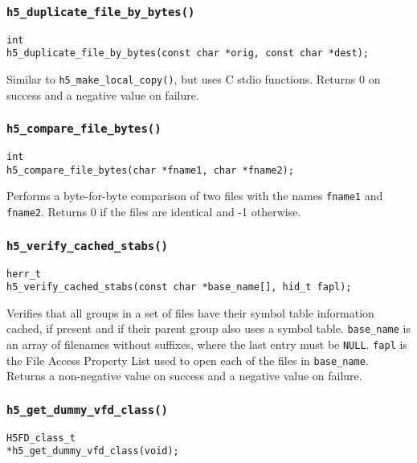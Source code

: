 \documentclass[../HDF5_RFC.tex]{subfiles}
\begin{document}
\subsubsection{\texttt{h5\_duplicate\_file\_by\_bytes()}}

\begin{verbatim}
int
h5_duplicate_file_by_bytes(const char *orig, const char *dest);
\end{verbatim}

Similar to \texttt{h5\_make\_local\_copy()}, but uses C stdio functions. Returns 0 on success and a
negative value on failure.

\subsubsection{\texttt{h5\_compare\_file\_bytes()}}

\begin{verbatim}
int
h5_compare_file_bytes(char *fname1, char *fname2);
\end{verbatim}

Performs a byte-for-byte comparison of two files with the names \texttt{fname1} and \texttt{fname2}.
Returns 0 if the files are identical and -1 otherwise.

\subsubsection{\texttt{h5\_verify\_cached\_stabs()}}

\begin{verbatim}
herr_t
h5_verify_cached_stabs(const char *base_name[], hid_t fapl);
\end{verbatim}

Verifies that all groups in a set of files have their symbol table information cached, if present
and if their parent group also uses a symbol table. \texttt{base\_name} is an array of filenames
without suffixes, where the last entry must be \texttt{NULL}. \texttt{fapl} is the File Access
Property List used to open each of the files in \texttt{base\_name}. Returns a non-negative value
on success and a negative value on failure.

\subsubsection{\texttt{h5\_get\_dummy\_vfd\_class()}}

\begin{verbatim}
H5FD_class_t
*h5_get_dummy_vfd_class(void);
\end{verbatim}
\end{document}
